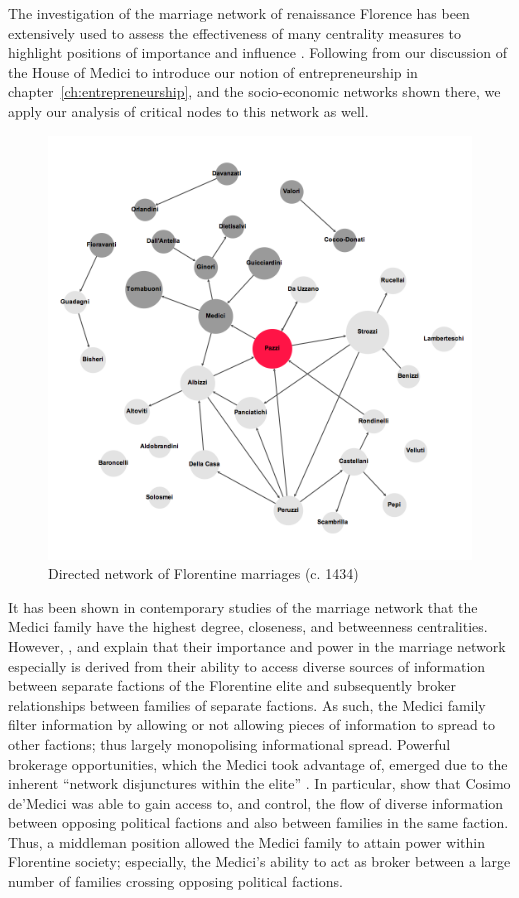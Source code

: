 The investigation of the marriage network of renaissance Florence has been extensively used to assess the effectiveness of many centrality measures to highlight positions of importance and influence \citep{Newman2003betweenness}. Following from our discussion of the House of Medici to introduce our notion of entrepreneurship in chapter~\ref{ch:entrepreneurship}, and the socio-economic networks shown there, we apply our analysis of critical nodes to this network as well.

\begin{figure}[t]
\centering
\includegraphics[scale=0.37]{imgs/Florentine-marr.png}
\caption{Directed network of Florentine marriages (c. 1434)}
\label{Fig:FlorentineFamilies}
\end{figure}

It has been shown in contemporary studies of the marriage network that the Medici family have the highest degree, closeness, and betweenness centralities. However, \citet{Roover1963}, \citet{Padgett1994} and \citet{Goldthwaite2009} explain that their importance and power in the marriage network especially is derived from their ability to access diverse sources of information between separate factions of the Florentine elite and subsequently broker relationships between families of separate factions. As such, the Medici family filter information by allowing or not allowing pieces of information to spread to other factions; thus largely monopolising informational spread. Powerful brokerage opportunities, which the Medici took advantage of, emerged due to the inherent ``network disjunctures within the elite'' \citep[p.~1259]{Padgett1993}. In particular, \citet{Padgett1993} show that Cosimo de'Medici was able to gain access to, and control, the flow of diverse information between opposing political factions and also between families in the same faction. Thus, a middleman position allowed the Medici family to attain power within Florentine society; especially, the Medici's ability to act as broker between a large number of families crossing opposing political factions.

